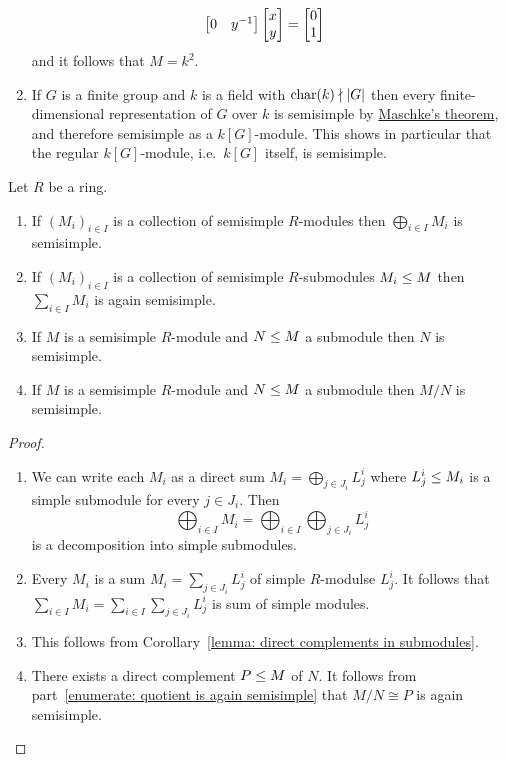 \begin{example}
\begin{enumerate}
\begin{align*}
\begin{bmatrix}
              0 & y^{-1}
            \end{bmatrix}
            \begin{bmatrix}x \\ y\end{bmatrix}
        &=  \begin{bmatrix}0 \\ 1\end{bmatrix}
      \end{align*}
      and it follows that $M = k^2$.
    \item
      If $G$ is a finite group and $k$ is a field with $\operatorname{char}(k) \nmid |G|$ then every finite-dimensional representation of $G$ over $k$ is semisimple by \hyperref[theorem: maschkes theorem]{Maschke’s theorem}, and therefore semisimple as a $k[G]$-module.
      This shows in particular that the regular $k[G]$-module, i.e.\ $k[G]$ itself, is semisimple.
  \end{enumerate}
\end{example}




\begin{lemma}
  \label{lemma: inherit semisimple}
  Let $R$ be a ring.
  \begin{enumerate}
    \item
      If $(M_i)_{i \in I}$ is a collection of semisimple $R$-modules then $\bigoplus_{i \in I} M_i$ is semisimple.
    \item
      If $(M_i)_{i \in I}$ is a collection of semisimple $R$-submodules $M_i \leq M$ then $\sum_{i \in I} M_i$ is again semisimple.
    \item
      If $M$ is a semisimple $R$-module and $N \leq M$ a submodule then $N$ is semisimple.
    \item
      \label{enumerate: quotient is again semisimple}
      If $M$ is a semisimple $R$-module and $N \leq M$ a submodule then $M/N$ is semisimple.
  \end{enumerate}
\end{lemma}


\begin{proof}
  \leavevmode
  \begin{enumerate}
    \item
      We can write each $M_i$ as a direct sum $M_i = \bigoplus_{j \in J_i} L^i_j$ where $L^i_j \leq M_i$ is a simple submodule for every $j \in J_i$.
      Then
      \[
          \bigoplus_{i \in I} M_i
        = \bigoplus_{i \in I} \bigoplus_{j \in J_i} L^i_j
      \]
      is a decomposition into simple submodules.
    \item
      Every $M_i$ is a sum $M_i = \sum_{j \in J_i} L^i_j$ of simple $R$-modulse $L^i_j$.
      It follows that $\sum_{i \in I} M_i = \sum_{i \in I} \sum_{j \in J_i} L^i_j$ is sum of simple modules.
    \item
      This follows from Corollary~\ref{lemma: direct complements in submodules}.
    \item
      There exists a direct complement $P \leq M$ of $N$.
      It follows from part~\ref*{enumerate: quotient is again semisimple} that $M/N \cong P$ is again semisimple.
    \qedhere
  \end{enumerate}
\end{proof}



